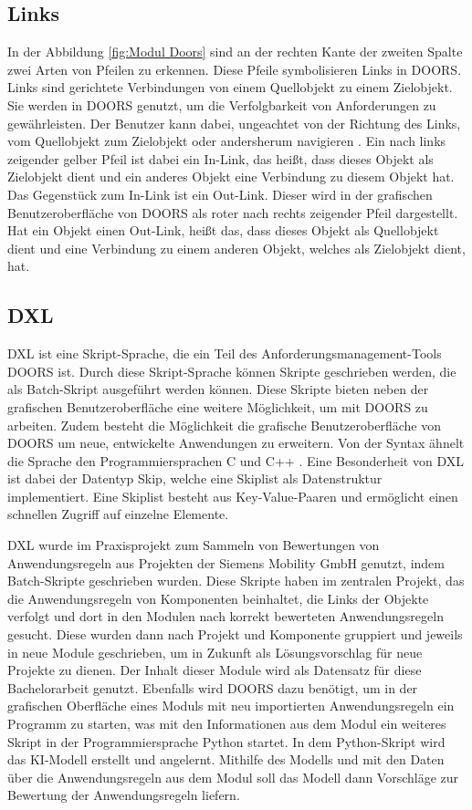 \subsection{Links}
In der Abbildung \ref*{fig:Modul Doors} sind an der rechten Kante der zweiten Spalte zwei Arten von Pfeilen zu erkennen. Diese Pfeile
symbolisieren Links in \ac{DOORS}. Links sind gerichtete Verbindungen von einem Quellobjekt zu einem Zielobjekt. Sie werden in \ac{DOORS} 
genutzt, um die Verfolgbarkeit von Anforderungen zu gewährleisten. Der Benutzer kann 
dabei, ungeachtet von der Richtung des Links, vom Quellobjekt zum Zielobjekt oder andersherum navigieren \cite[vgl. S.183]{DOORS}. 
Ein nach links zeigender gelber Pfeil ist dabei ein In-Link, das heißt, dass dieses Objekt als Zielobjekt dient und ein anderes Objekt 
eine Verbindung zu diesem Objekt hat. Das Gegenstück zum In-Link ist ein Out-Link. Dieser wird in der grafischen Benutzeroberfläche von 
\ac{DOORS} als roter nach rechts zeigender Pfeil dargestellt. Hat ein Objekt einen Out-Link, heißt das, dass dieses Objekt als Quellobjekt 
dient und eine Verbindung zu einem anderen Objekt, welches als Zielobjekt dient, hat.   

\subsection{DXL}

\ac{DXL} ist eine Skript-Sprache, die ein Teil des Anforderungsmanagement-Tools \ac{DOORS} ist. Durch diese Skript-Sprache
können Skripte geschrieben werden, die als Batch-Skript ausgeführt werden können. Diese Skripte bieten neben der grafischen Benutzeroberfläche eine weitere Möglichkeit, 
um mit \ac{DOORS} zu arbeiten. Zudem besteht die Möglichkeit die grafische Benutzeroberfläche von \ac{DOORS} um neue, entwickelte Anwendungen zu
erweitern. Von der Syntax ähnelt die Sprache den Programmiersprachen C und C++ \cite[vgl. S.1]{DXL}. Eine Besonderheit von \ac{DXL} ist dabei der Datentyp Skip, 
welche eine Skiplist als Datenstruktur implementiert. Eine Skiplist besteht aus Key-Value-Paaren und ermöglicht einen schnellen Zugriff auf einzelne Elemente.

\ac{DXL} wurde im Praxisprojekt zum Sammeln von Bewertungen von Anwendungsregeln aus Projekten der Siemens Mobility GmbH 
genutzt, indem Batch-Skripte geschrieben wurden. Diese Skripte haben im zentralen Projekt, das die Anwendungsregeln von Komponenten beinhaltet, die Links der Objekte
verfolgt und dort in den Modulen nach korrekt bewerteten Anwendungsregeln gesucht. Diese wurden dann nach Projekt und Komponente gruppiert und 
jeweils in neue Module geschrieben, um in Zukunft als Lösungsvorschlag für neue Projekte zu dienen. Der Inhalt dieser Module wird als Datensatz für diese Bachelorarbeit genutzt.
Ebenfalls wird \ac{DOORS} dazu benötigt, um in der grafischen Oberfläche eines Moduls mit neu importierten Anwendungsregeln ein Programm zu starten, was mit den Informationen aus dem Modul
ein weiteres Skript in der Programmiersprache Python startet. In dem Python-Skript wird das KI-Modell erstellt und angelernt. Mithilfe des Modells und mit den Daten über die Anwendungsregeln aus 
dem Modul soll das Modell dann Vorschläge zur Bewertung der Anwendungsregeln liefern.

